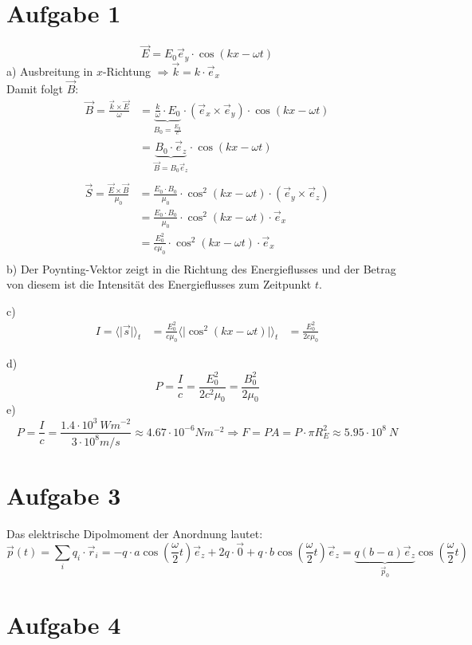 \documentclass[11pt a4paper]{article}
\begin{document}
\thispagestyle{fancy}

\section*{Aufgabe 1}
\[ \vec E = E_0 \vec e_y \cdot \cos(kx - \omega t) \]
a) Ausbreitung in $x$-Richtung $\Rightarrow \vec k = k \cdot \vec e_x $ \\
Damit folgt $\vec B$:
\begin{align*}
	\vec B = \frac{\vec k \times \vec E}{\omega} 
	&= \underbrace{\frac{k}{\omega} \cdot E_0}_{B_0 = \frac{E_0}{c}}
		\cdot (\vec e_x \times \vec e_y) \cdot \cos(kx - \omega t) \\
	&= \underbrace{B_0 \cdot \vec e_z}_{\vec B = B_0 \vec e_z} \cdot \cos(kx - \omega t) \\
\end{align*}
\begin{align*}
	\vec S = \frac{\vec E \times \vec B}{\mu_0}
	&= \frac{E_0 \cdot B_0}{\mu_0} \cdot \cos^2(kx - \omega t) \cdot (\vec e_y \times \vec e_z) \\
	&= \frac{E_0 \cdot B_0}{\mu_0} \cdot \cos^2(kx - \omega t) \cdot \vec e_x \\
	&= \frac{E_0^2}{c \mu_0} \cdot \cos^2(kx - \omega t) \cdot \vec e_x \\
\end{align*}
b) Der Poynting-Vektor zeigt in die Richtung des Energieflusses und der Betrag von diesem ist die Intensität des 
Energieflusses zum Zeitpunkt $t$.

\vspace{0.5cm}
\noindent 
c)
\begin{align*}
	I = \langle \vert \vec s \vert \rangle_t 
	&= \frac{E_0^2}{c\mu_0} \langle \vert \cos^2(kx - \omega t) \vert \rangle_t
	&= \frac{E_0^2}{2c\mu_0}
\end{align*}

\vspace{0.5cm}
\noindent 
d)
\[ P = \frac{I}{c} = \frac{E_0^2}{2c^2\mu_0} = \frac{B_0^2}{2\mu_0} \]
e) 
\[ P = \frac{I}{c} = \frac{1.4 \cdot 10^3 \ Wm^{-2}}{3 \cdot 10^8 m/s} \approx 4.67 \cdot 10^{-6} Nm^{-2} 
\Rightarrow 
F = PA = P \cdot \pi R_E^2 \approx 5.95 \cdot 10^{8} \ N 
\]

\newpage
\setlength{\headheight}{0cm}

\section*{Aufgabe 3}
Das elektrische Dipolmoment der Anordnung lautet:
\[ 
	\vec p(t) 
	= \sum_{i} q_i \cdot \vec r_i 
	= -q \cdot a \cos\left(\frac\omega2 t\right) \vec e_z + 2q \cdot \vec 0 
	+ q \cdot b \cos\left(\frac\omega2 t\right) \vec e_z
	= \underbrace{q (b - a) \vec e_z}_{\vec p_0} \cos\left(\frac\omega2 t\right)
\]

\section*{Aufgabe 4}
\end{document}
